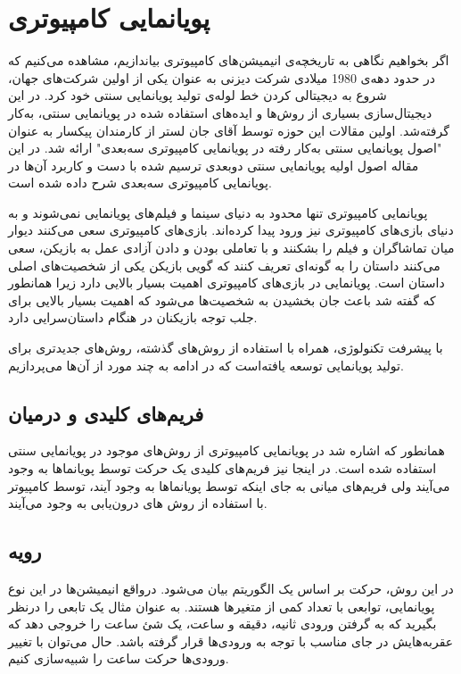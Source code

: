 \section{پویانمایی کامپیوتری}

اگر بخواهیم نگاهی به تاریخچه‌ی انیمیشن‌های کامپیوتری بیاندازیم، مشاهده می‌کنیم که 
در حدود دهه‌ی 1980 میلادی شرکت دیزنی به عنوان یکی از اولین شرکت‌های جهان، شروع به 
دیجیتالی کردن خط لوله‌ی تولید پویانمایی سنتی خود کرد.
در این دیجیتال‌سازی بسیاری از روش‌ها و ایده‌‌های استفاده شده در پویانمایی سنتی،
به‌کار گرفته‌شد.
اولین مقالات این حوزه توسط آقای جان لستر از کارمندان پیکسار به عنوان 
"اصول پویانمایی سنتی به‌کار رفته در پویانمایی کامپیوتری سه‌بعدی"
ارائه شد.
در این مقاله اصول اولیه پویانمایی سنتی دوبعدی ترسیم شده با دست
و کاربرد آن‌ها در پویانمایی کامپیوتری سه‌بعدی شرح داده شده است.
\cite{Lasseter1987animation}
 
پویانمایی کامپیوتری تنها محدود به دنیای سینما و فیلم‌های پویانمایی نمی‌شوند و به دنیای
بازی‌های کامپیوتری نیز ورود پیدا کرده‌اند. بازی‌های کامپیوتری سعی می‌کنند دیوار میان تماشاگران و فیلم را بشکنند و 
با تعاملی بودن و دادن آزادی عمل به بازیکن، سعی می‌کنند داستان را به گونه‌ای تعریف کنند که گویی بازیکن یکی از شخصیت‌های اصلی داستان است.
پویانمایی در بازی‌های کامپیوتری اهمیت بسیار بالایی دارد زیرا همانطور که گفته شد باعث 
جان بخشیدن به شخصیت‌ها می‌شود که اهمیت بسیار بالایی برای جلب توجه بازیکنان در هنگام داستان‌سرایی دارد.

با پیشرفت تکنولوژی، همراه با استفاده از روش‌های گذشته، روش‌های جدیدتری برای تولید پویانمایی توسعه یافته‌است که 
در ادامه به چند مورد از آن‌‌ها می‌پردازیم.

\subsection{فریم‌های کلیدی و درمیان}

همانطور که اشاره شد در پویانمایی کامپیوتری از روش‌های موجود در 
پویانمایی سنتی استفاده شده است. در اینجا نیز فریم‌های کلیدی 
یک حرکت توسط پویانماها به وجود می‌‌آیند ولی فریم‌های میانی به جای اینکه توسط پویانماها به وجود آیند،
توسط کامپیوتر با استفاده از روش های درون‌یابی به وجود می‌آیند.

\subsection{رویه}

در این روش، حرکت بر اساس یک الگوریتم بیان می‌شود.
درواقع انیمیشن‌ها در این نوع پویانمایی، توابعی با تعداد کمی از متغیر‌ها هستند.
به عنوان مثال یک تابعی را درنظر بگیرید که به گرفتن ورودی ثانیه، دقیقه و ساعت، 
یک شئ ساعت را خروجی دهد که عقربه‌هایش در جای مناسب با توجه به ورودی‌ها قرار گرفته باشد.
حال می‌توان با تغییر ورودی‌ها حرکت ساعت را شبیه‌سازی کنیم.

